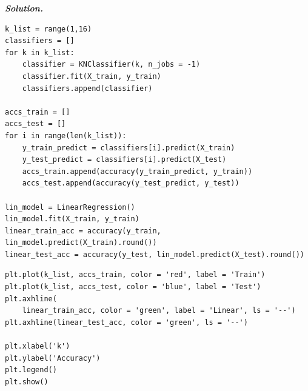 \documentclass[12pt]{article}
\newenvironment{solution}[1][\it{Solution}]{\textbf{#1. } }{\vspace{.5cm}}
\begin{document}
\begin{solution}
\begin{tcolorbox}[width=\linewidth, sharp corners=all, colback=white!95!black]
\begin{verbatim}
k_list = range(1,16)
classifiers = []
for k in k_list:
    classifier = KNClassifier(k, n_jobs = -1)
    classifier.fit(X_train, y_train)
    classifiers.append(classifier)

accs_train = []
accs_test = []
for i in range(len(k_list)):
    y_train_predict = classifiers[i].predict(X_train)
    y_test_predict = classifiers[i].predict(X_test)
    accs_train.append(accuracy(y_train_predict, y_train))
    accs_test.append(accuracy(y_test_predict, y_test))

lin_model = LinearRegression()
lin_model.fit(X_train, y_train)
linear_train_acc = accuracy(y_train, lin_model.predict(X_train).round())
linear_test_acc = accuracy(y_test, lin_model.predict(X_test).round())
\end{verbatim}
\end{tcolorbox}
\newpage

\begin{tcolorbox}[width=\linewidth, sharp corners=all, colback=white!95!black]

    \begin{verbatim}
plt.plot(k_list, accs_train, color = 'red', label = 'Train')
plt.plot(k_list, accs_test, color = 'blue', label = 'Test')
plt.axhline(
    linear_train_acc, color = 'green', label = 'Linear', ls = '--')
plt.axhline(linear_test_acc, color = 'green', ls = '--')

plt.xlabel('k')
plt.ylabel('Accuracy')
plt.legend()
plt.show()
\end{verbatim}
\end{tcolorbox}
\end{solution}
\end{document}
